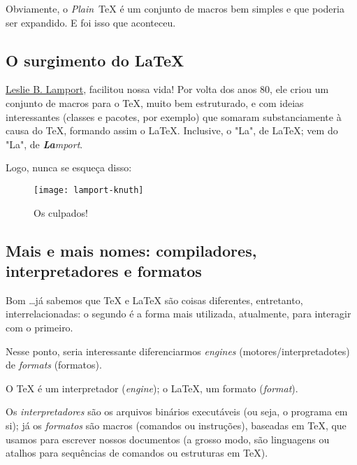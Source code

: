 Obviamente, o \textit{Plain}~\TeX{} é um conjunto de macros bem simples e que 
poderia ser expandido.
E foi isso que aconteceu.

\subsection{O surgimento do \LaTeX} %

\href{https://pt.wikipedia.org/wiki/Leslie_Lamport}{Leslie B. Lamport}, facilitou 
nossa vida! 
Por volta dos anos 80, ele criou um conjunto de macros para o \TeX, muito bem 
estruturado, e com ideias interessantes (classes e pacotes, por exemplo) que 
somaram substanciamente à causa do \TeX{}, formando assim o \LaTeX.
Inclusive, o "La", de \LaTeX{}; vem do "La", de \textit{\textbf{La}mport}.

Logo, nunca se esqueça disso:

\begin{center}
\end{center}

\begin{figure}[!ht]
  \centering
  \texttt{[image: lamport-knuth]}
  \caption{Os culpados!}
\end{figure}

\subsection{Mais e mais nomes: compiladores, interpretadores e formatos} %

Bom \ldots já sabemos que  \TeX{} e \LaTeX{} são coisas diferentes, entretanto,
interrelacionadas: o segundo é a forma mais utilizada, atualmente, para 
interagir com o primeiro.

Nesse ponto, seria interessante diferenciarmos \textit{engines} (motores/interpretadotes) 
de \textit{formats} (formatos).

O \TeX{} é um interpretador (\textit{engine}); o \LaTeX, um formato (\textit{format}).


Os \textit{interpretadores} são os arquivos binários executáveis (ou seja, o 
programa em si); já os \textit{formatos} são macros (comandos ou instruções), 
baseadas em \TeX, que usamos para escrever nossos documentos (a grosso modo, são
linguagens ou atalhos para sequências de comandos ou estruturas em \TeX).

